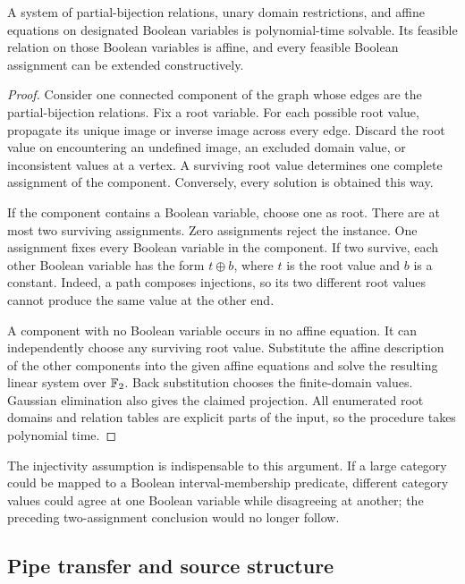 \begin{lemma}
\label{cse:algebra}
A system of partial-bijection relations, unary domain restrictions, and
affine equations on designated Boolean variables is polynomial-time
solvable. Its feasible relation on those Boolean variables is affine, and
every feasible Boolean assignment can be extended constructively.
\end{lemma}
\begin{proof}
Consider one connected component of the graph whose edges are the
partial-bijection relations. Fix a root variable. For each possible root
value, propagate its unique image or inverse image across every edge.
Discard the root value on encountering an undefined image, an excluded
domain value, or inconsistent values at a vertex. A surviving root value
determines one complete assignment of the component. Conversely, every
solution is obtained this way.

If the component contains a Boolean variable, choose one as root. There
are at most two surviving assignments. Zero assignments reject the
instance. One assignment fixes every Boolean variable in the component.
If two survive, each other Boolean variable has the form $t\oplus b$,
where $t$ is the root value and $b$ is a constant. Indeed, a path composes
injections, so its two different root values cannot produce the same
value at the other end.

A component with no Boolean variable occurs in no affine equation. It
can independently choose any surviving root value. Substitute the affine
description of the other components into the given affine equations and
solve the resulting linear system over $\mathbb F_2$. Back substitution chooses
the finite-domain values. Gaussian elimination also gives the claimed
projection. All enumerated root domains and relation tables are explicit
parts of the input, so the procedure takes polynomial time.
\end{proof}

The injectivity assumption is indispensable to this argument. If a large
category could be mapped to a Boolean interval-membership predicate,
different category values could agree at one Boolean variable while
disagreeing at another; the preceding two-assignment conclusion would no
longer follow.

\subsection{Pipe transfer and source structure}

